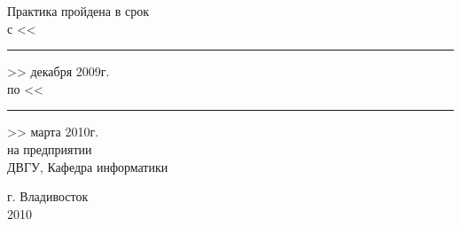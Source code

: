 \documentclass[a4paper,14pt]{article} %
\begin{document}
\begin{titlepage}
\begin{multicols}{2}
    \bigskip

    Практика пройдена в срок \\
    с <<\rule{1cm}{0.5pt}>> декабря 2009г. \\
    по <<\rule{1cm}{0.5pt}>> марта 2010г. \\
    на предприятии \\
    ДВГУ, Кафедра информатики \\

\end{multicols}

\vfill

\begin{center}
    г. Владивосток\\
    2010
\end{center}

\end{titlepage} %

\setcounter{page}{2}
\begin{center}
\renewcommand{\contentsname}{Оглавление}
\tableofcontents %
\end{center}

\newpage











\end{document}
